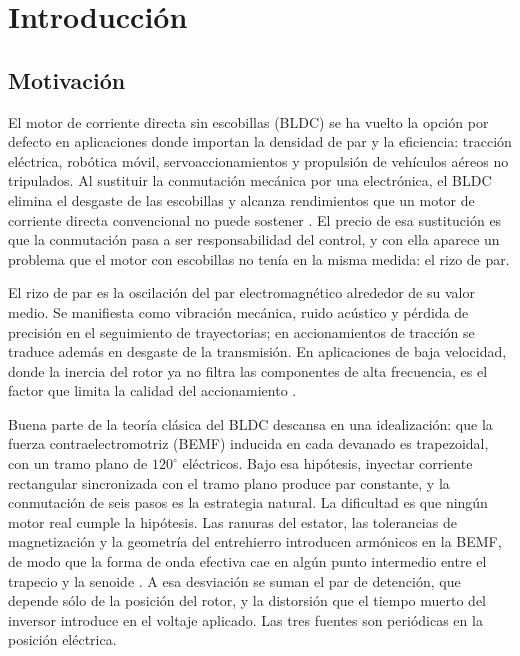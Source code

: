 \documentclass[../../../Tesis_JALS_Maestria.tex]{subfiles}
\begin{document}
\chapter{Introducción}
\label{cap:introduccion}

\section{Motivación}
\label{sec:motivacion}

El motor de corriente directa sin escobillas (BLDC) se ha vuelto la opción por defecto en aplicaciones donde importan la densidad de par y la eficiencia: tracción eléctrica, robótica móvil, servoaccionamientos y propulsión de vehículos aéreos no tripulados. Al sustituir la conmutación mecánica por una electrónica, el BLDC elimina el desgaste de las escobillas y alcanza rendimientos que un motor de corriente directa convencional no puede sostener \citep{krishnan2009pmbldc}. El precio de esa sustitución es que la conmutación pasa a ser responsabilidad del control, y con ella aparece un problema que el motor con escobillas no tenía en la misma medida: el rizo de par.

El rizo de par es la oscilación del par electromagnético alrededor de su valor medio. Se manifiesta como vibración mecánica, ruido acústico y pérdida de precisión en el seguimiento de trayectorias; en accionamientos de tracción se traduce además en desgaste de la transmisión. En aplicaciones de baja velocidad, donde la inercia del rotor ya no filtra las componentes de alta frecuencia, es el factor que limita la calidad del accionamiento \citep{jahns1996pulsating}.

Buena parte de la teoría clásica del BLDC descansa en una idealización: que la fuerza contraelectromotriz (BEMF) inducida en cada devanado es trapezoidal, con un tramo plano de $120^\circ$ eléctricos. Bajo esa hipótesis, inyectar corriente rectangular sincronizada con el tramo plano produce par constante, y la conmutación de seis pasos es la estrategia natural. La dificultad es que ningún motor real cumple la hipótesis. Las ranuras del estator, las tolerancias de magnetización y la geometría del entrehierro introducen armónicos en la BEMF, de modo que la forma de onda efectiva cae en algún punto intermedio entre el trapecio y la senoide \citep{shao2003direct}. A esa desviación se suman el par de detención, que depende sólo de la posición del rotor, y la distorsión que el tiempo muerto del inversor introduce en el voltaje aplicado. Las tres fuentes son periódicas en la posición eléctrica.
\end{document}
